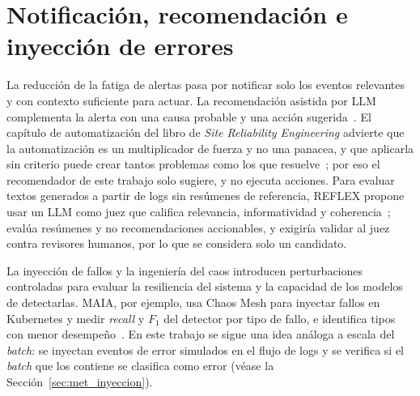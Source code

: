 \section{Notificación, recomendación e inyección de errores}\label{sec:mt_reaccion}

La reducción de la fatiga de alertas pasa por notificar solo los eventos relevantes y con contexto suficiente para actuar. La recomendación asistida por LLM complementa la alerta con una causa probable y una acción sugerida~\cite{pedroso2025_maia}. El capítulo de automatización del libro de \textit{Site Reliability Engineering} advierte que la automatización es un multiplicador de fuerza y no una panacea, y que aplicarla sin criterio puede crear tantos problemas como los que resuelve~\cite{murphy2016_sre_automation}; por eso el recomendador de este trabajo solo sugiere, y no ejecuta acciones. Para evaluar textos generados a partir de logs sin resúmenes de referencia, REFLEX propone usar un LLM como juez que califica relevancia, informatividad y coherencia~\cite{mudgal2025_reflex}; evalúa resúmenes y no recomendaciones accionables, y exigiría validar al juez contra revisores humanos, por lo que se considera solo un candidato. %

La inyección de fallos y la ingeniería del caos introducen perturbaciones controladas para evaluar la resiliencia del sistema y la capacidad de los modelos de detectarlas. MAIA, por ejemplo, usa Chaos Mesh para inyectar fallos en Kubernetes y medir \textit{recall} y $F_1$ del detector por tipo de fallo, e identifica tipos con menor desempeño~\cite{pedroso2025_maia}. En este trabajo se sigue una idea análoga a escala del \textit{batch}: se inyectan eventos de error simulados en el flujo de logs y se verifica si el \textit{batch} que los contiene se clasifica como error (véase la Sección~\ref{sec:met_inyeccion}).
